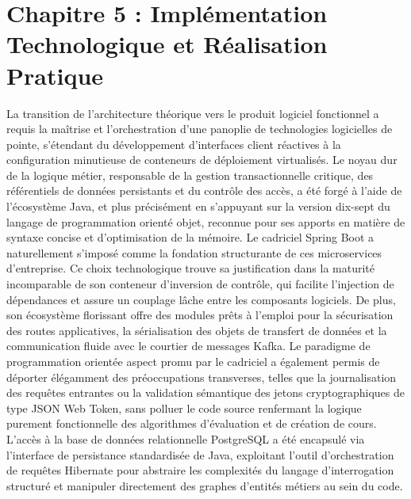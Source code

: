 \section{Chapitre 5 : Implémentation Technologique et Réalisation Pratique}

La transition de l'architecture théorique vers le produit logiciel fonctionnel a requis la maîtrise et l'orchestration d'une panoplie de technologies logicielles de pointe, s'étendant du développement d'interfaces client réactives à la configuration minutieuse de conteneurs de déploiement virtualisés. Le noyau dur de la logique métier, responsable de la gestion transactionnelle critique, des référentiels de données persistants et du contrôle des accès, a été forgé à l'aide de l'écosystème Java, et plus précisément en s'appuyant sur la version dix-sept du langage de programmation orienté objet, reconnue pour ses apports en matière de syntaxe concise et d'optimisation de la mémoire. Le cadriciel Spring Boot a naturellement s'imposé comme la fondation structurante de ces microservices d'entreprise. Ce choix technologique trouve sa justification dans la maturité incomparable de son conteneur d'inversion de contrôle, qui facilite l'injection de dépendances et assure un couplage lâche entre les composants logiciels. De plus, son écosystème florissant offre des modules prêts à l'emploi pour la sécurisation des routes applicatives, la sérialisation des objets de transfert de données et la communication fluide avec le courtier de messages Kafka. Le paradigme de programmation orientée aspect promu par le cadriciel a également permis de déporter élégamment des préoccupations transverses, telles que la journalisation des requêtes entrantes ou la validation sémantique des jetons cryptographiques de type JSON Web Token, sans polluer le code source renfermant la logique purement fonctionnelle des algorithmes d'évaluation et de création de cours. L'accès à la base de données relationnelle PostgreSQL a été encapsulé via l'interface de persistance standardisée de Java, exploitant l'outil d'orchestration de requêtes Hibernate pour abstraire les complexités du langage d'interrogation structuré et manipuler directement des graphes d'entités métiers au sein du code.

